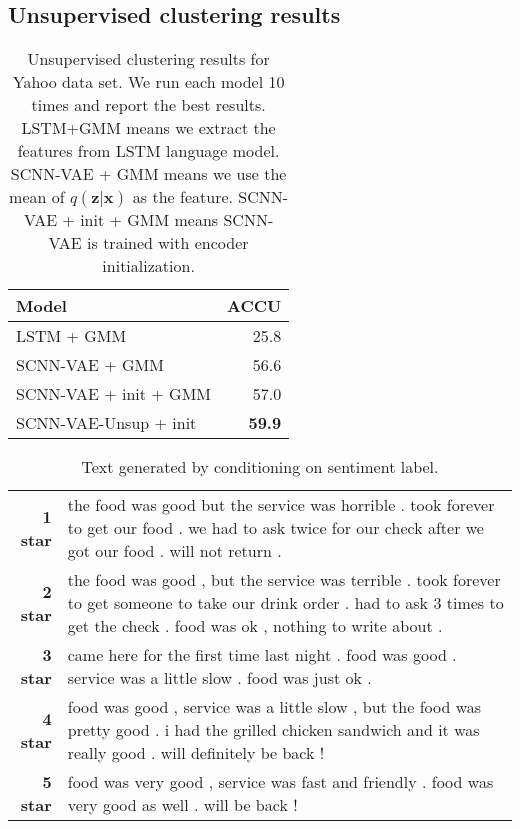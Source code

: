 \documentclass{article}
\begin{document}
\subsection{Unsupervised clustering results}
\begin{table}[!thp]
  \centering
  \begin{tabular}{l r}
    Model & ACCU  \\
    \toprule
    LSTM + GMM &  25.8  \\
    SCNN-VAE + GMM  & 56.6 \\
    SCNN-VAE + init + GMM & 57.0 \\
    \midrule
    SCNN-VAE-Unsup + init & {\bf 59.9} \\
    \bottomrule
  \end{tabular}
  \caption{Unsupervised clustering results for Yahoo data set. We run each
    model 10 times and report the best results. LSTM+GMM means we extract the
    features from LSTM language model. SCNN-VAE + GMM means we use the mean of
    $q(\mathbf{z}|\mathbf{x})$ as the feature. SCNN-VAE + init + GMM means
    SCNN-VAE is trained with encoder initialization.}
  \label{tab:yahoosemi_compare}
\end{table}
\begin{table*}[!thbp]
  \centering
  \small
  \begin{tabular}{r  p{12cm}}
    \toprule
    {\bf 1 star} & the food was good but the service was horrible .
    took forever to get our food .
    we had to ask twice for our check after we got our food . will not return .  \\
    {\bf 2 star} & the food was good , but the service was terrible .
    took forever to get someone to take our drink order .
    had to ask 3 times to get the check . food was ok , nothing to write about . \\
    {\bf 3 star} & came here for the first time last night .
    food was good . service was a little slow . food was just ok . \\
    {\bf 4 star} & food was good , service was a little slow ,
    but the food was pretty good . i had the grilled chicken sandwich and it
    was really good . will definitely be back !
 \\
    {\bf 5 star} & food was very good , service was fast and friendly .
    food was very good as well . will be back !                     \\
    \bottomrule
  \end{tabular}
  \caption{Text generated by conditioning on sentiment label.}
  \label{tab:yelp_sample_paper}
\end{table*}
\end{document}
